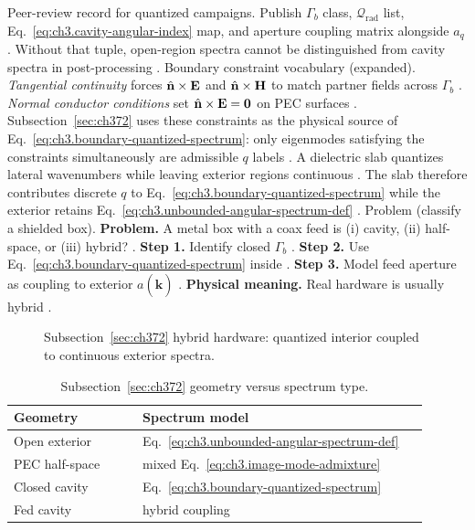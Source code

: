 Peer-review record for quantized campaigns. Publish \(\Gamma_{b}\) class, \(\mathcal{Q}_{\mathrm{rad}}\) list, Eq.~\eqref{eq:ch3.cavity-angular-index} map, and aperture coupling matrix
alongside \(a_{q}\) \cite{harrington2001}. Without that tuple, open-region spectra cannot be distinguished
from cavity spectra in post-processing \cite{hansen1988}.
Boundary constraint vocabulary (expanded). \emph{Tangential continuity} forces \(\hat{\mathbf{n}}\times\mathbf{E}\) and \(\hat{\mathbf{n}}\times\mathbf{H}\) to match partner fields across
\(\Gamma_{b}\) \cite{stratton1941}. \emph{Normal conductor conditions} set \(\hat{\mathbf{n}}\times\mathbf{E}=\mathbf{0}\) on PEC
surfaces \cite{stratton1941}. Subsection~\ref{sec:ch372} uses these constraints as the physical source of Eq.~\eqref{eq:ch3.boundary-quantized-spectrum}:
only eigenmodes satisfying the constraints simultaneously are admissible \(q\) labels \cite{harrington2001}.
A dielectric slab quantizes lateral wavenumbers while leaving exterior regions continuous \cite{jackson1999}. The
slab therefore contributes discrete \(q\) to Eq.~\eqref{eq:ch3.boundary-quantized-spectrum} while the exterior retains
Eq.~\eqref{eq:ch3.unbounded-angular-spectrum-def} \cite{stratton1941}.
Problem (classify a shielded box). \textbf{Problem.} A metal box with a coax feed is (i) cavity, (ii) half-space, or (iii) hybrid? \cite{harrington2001}.
\textbf{Step 1.} Identify closed \(\Gamma_{b}\) \cite{stratton1941}.
\textbf{Step 2.} Use Eq.~\eqref{eq:ch3.boundary-quantized-spectrum} inside \cite{jackson1999}.
\textbf{Step 3.} Model feed aperture as coupling to exterior \(a(\widehat{\mathbf{k}})\) \cite{harrington2001}.
\textbf{Physical meaning.} Real hardware is usually hybrid \cite{hansen1988}.
\begin{figure}[t]
\centering
{}
\caption{Subsection~\ref{sec:ch372} hybrid hardware: quantized interior coupled to continuous exterior spectra.}
\label{fig:ch3.372-hybrid-hardware}
\end{figure}
\begin{table}[t]
\centering
\caption{Subsection~\ref{sec:ch372} geometry versus spectrum type.}
\label{tab:ch3.372-geometry-spectrum}
\small
\begin{tabular}{@{}p{0.28\linewidth}p{0.62\linewidth}@{}}
\toprule
Geometry & Spectrum model \\
\midrule
Open exterior & Eq.~\eqref{eq:ch3.unbounded-angular-spectrum-def} \\
PEC half-space & mixed Eq.~\eqref{eq:ch3.image-mode-admixture} \\
Closed cavity & Eq.~\eqref{eq:ch3.boundary-quantized-spectrum} \\
Fed cavity & hybrid coupling \\
\bottomrule
\end{tabular}
\end{table}
